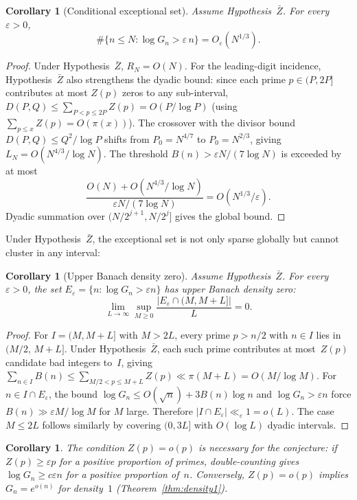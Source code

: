 \documentclass[11pt]{article}
\newtheorem{corollary}[theorem]{Corollary}
\theoremstyle{definition}
\theoremstyle{remark}
\begin{document}
\begin{corollary}[Conditional exceptional set]\label{cor:cond-except}
Assume Hypothesis~$\bar{Z}$. For every
$\varepsilon > 0$,
\[
\#\{n \le N : \log G_n > \varepsilon\,n\}
= O_\varepsilon(N^{1/3}).
\]
\end{corollary}

\begin{proof}
Under Hypothesis~$\bar{Z}$, $R_N = O(N)$.
For the leading-digit incidence,
Hypothesis~$\bar{Z}$ also strengthens the dyadic bound:
since each prime $p \in (P, 2P]$ contributes
at most $Z(p)$ zeros to any sub-interval,
$D(P,Q) \le \sum_{P<p\le 2P} Z(p) = O(P/\log P)$
(using $\sum_{p \le x} Z(p) = O(\pi(x))$).
The crossover with the divisor bound
$D(P,Q) \le Q^2/\log P$ shifts
from $P_0 = N^{4/7}$ to $P_0 = N^{2/3}$, giving
$L_N = O(N^{4/3}/\log N)$.
The threshold $B(n) > \varepsilon N/(7\log N)$
is exceeded by at most
\[
\frac{O(N) + O(N^{4/3}/\log N)}%
{\varepsilon N/(7\log N)}
= O(N^{1/3}/\varepsilon).
\]
Dyadic summation over $(N/2^{j+1}, N/2^j]$
gives the global bound.
\end{proof}

Under Hypothesis~$\bar{Z}$, the exceptional set
is not only sparse globally but cannot cluster
in any interval:

\begin{corollary}[Upper Banach density zero]\label{cor:banach}
Assume Hypothesis~$\bar{Z}$. For every $\varepsilon > 0$,
the set $E_\varepsilon = \{n : \log G_n > \varepsilon n\}$
has upper Banach density zero:
\[
\lim_{L\to\infty}
\sup_{M \ge 0}
\frac{|E_\varepsilon \cap (M, M+L]|}{L} = 0.
\]
\end{corollary}

\begin{proof}
For $I = (M, M+L]$ with $M > 2L$, every prime
$p > n/2$ with $n \in I$ lies in $(M/2,\, M+L]$.
Under Hypothesis~$\bar{Z}$, each such prime
contributes at most~$Z(p)$ candidate bad integers
to~$I$, giving
$\sum_{n \in I} B(n)
\le \sum_{M/2 < p \le M+L} Z(p)
\ll \pi(M+L) = O(M/\!\log M)$.
For $n \in I \cap E_\varepsilon$,
the bound $\log G_n \le O(\sqrt{n}) + 3B(n)\log n$
and $\log G_n > \varepsilon n$ force
$B(n) \gg \varepsilon M/\!\log M$ for $M$ large.
Therefore
$|I \cap E_\varepsilon| \ll_\varepsilon 1 = o(L)$.
The case $M \le 2L$ follows similarly by covering
$(0, 3L]$ with $O(\log L)$ dyadic intervals.
\end{proof}

\begin{corollary}\label{cor:necessary}
The condition $Z(p) = o(p)$ is \emph{necessary} for the
conjecture: if $Z(p) \ge \varepsilon p$
for a positive proportion of primes, double-counting gives
$\log G_n \ge c\varepsilon n$ for a positive proportion of~$n$.
Conversely, $Z(p) = o(p)$ implies $G_n = e^{o(n)}$
for density~$1$ (Theorem~\ref{thm:density1}).
\end{corollary}
\end{document}

